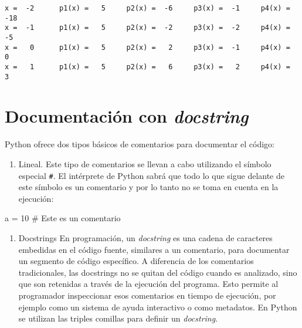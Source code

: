 \documentclass[
  letterpaper,
  DIV=11,
  numbers=noendperiod]{scrreprt}
\newenvironment{Shaded}{\begin{snugshade}}{\end{snugshade}}
\newcommand{\CommentTok}[1]{\textcolor[rgb]{0.37,0.37,0.37}{#1}}
\newcommand{\DecValTok}[1]{\textcolor[rgb]{0.68,0.00,0.00}{#1}}
\newcommand{\NormalTok}[1]{\textcolor[rgb]{0.00,0.23,0.31}{#1}}
\newcommand{\OperatorTok}[1]{\textcolor[rgb]{0.37,0.37,0.37}{#1}}
\providecommand{\tightlist}{%
  \setlength{\itemsep}{0pt}\setlength{\parskip}{0pt}}\usepackage{longtable,booktabs,array}
\begin{document}
\begin{verbatim}
x =  -2      p1(x) =   5     p2(x) =  -6     p3(x) =  -1     p4(x) = -18
x =  -1      p1(x) =   5     p2(x) =  -2     p3(x) =  -2     p4(x) =  -5
x =   0      p1(x) =   5     p2(x) =   2     p3(x) =  -1     p4(x) =   0
x =   1      p1(x) =   5     p2(x) =   6     p3(x) =   2     p4(x) =   3
\end{verbatim}


\chapter{\texorpdfstring{Documentación con
\emph{docstring}}{Documentación con docstring}}\label{documentaciuxf3n-con-docstring}

Python ofrece dos tipos básicos de comentarios para documentar el
código:

\begin{enumerate}
\def\labelenumi{\arabic{enumi}.}
\tightlist
\item
  Lineal. Este tipo de comentarios se llevan a cabo utilizando el
  símbolo especial \texttt{\#}. El intérprete de Python sabrá que todo
  lo que sigue delante de este símbolo es un comentario y por lo tanto
  no se toma en cuenta en la ejecución:
\end{enumerate}

\begin{Shaded}
\begin{Highlighting}[]
\NormalTok{a }\OperatorTok{=} \DecValTok{10} \CommentTok{\# Este es un comentario}
\end{Highlighting}
\end{Shaded}

\begin{enumerate}
\def\labelenumi{\arabic{enumi}.}
\setcounter{enumi}{1}
\tightlist
\item
  Docstrings En programación, un \emph{docstring} es una cadena de
  caracteres embedidas en el código fuente, similares a un comentario,
  para documentar un segmento de código específico. A diferencia de los
  comentarios tradicionales, las docstrings no se quitan del código
  cuando es analizado, sino que son retenidas a través de la ejecución
  del programa. Esto permite al programador inspeccionar esos
  comentarios en tiempo de ejecución, por ejemplo como un sistema de
  ayuda interactivo o como metadatos. En Python se utilizan las triples
  comillas para definir un \emph{docstring}.
\end{enumerate}
\end{document}
